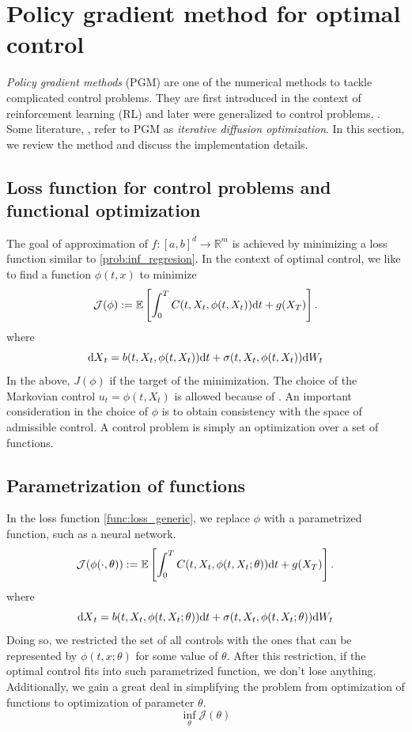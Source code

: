 \documentclass[11pt]{book}
\newcommand{\dt}{\text{\normalfont d}t}
\newcommand{\dX}{\text{\normalfont d}X}
\newcommand{\dW}{\text{\normalfont d}W}
\begin{document}
\section{Policy gradient method for optimal control}
\emph{Policy gradient methods} (PGM) are one of the numerical methods to tackle complicated control problems. They are first introduced in the context of reinforcement learning (RL) and later were generalized to control problems, \citet{Powell19}. Some literature, \citet{NR21}, refer to PGM as \emph{iterative diffusion optimization}. In this section, we review the method and discuss the implementation details. 
\subsection{Loss function for control problems and functional optimization}
The goal of  approximation of $f:[a,b]^d\to\mathbb{R}^m$ is achieved by minimizing a loss function similar to \eqref{prob:inf_regresion}. 
In the context of optimal control, we like to find a function $\phi(t,x)$ to minimize
\begin{equation}\label{func:loss_generic}
{\mathcal{J}}(\phi):=\mathbb{E}\left[\int_0^T C(t,X_t,\phi(t,X_t)){{\dt}}+g(X_T)\right].
\end{equation}
where 
\[
{\dX}_t =b(t,X_t,\phi(t,X_t)){{\dt}}+\sigma(t,X_t,\phi(t,X_t))\dW_t
\]
In the above, $J(\phi)$ if the target of the minimization. The choice of the Markovian control $u_t=\phi(t,X_t)$ is allowed because of \citet{el1987compactification,haussmann1986existence}. An important consideration in the choice of $\phi$ is to obtain consistency with the space of admissible control. 
A control problem is simply an optimization over a set of functions.
\subsection{Parametrization of functions}
In the loss function \eqref{func:loss_generic}, we replace $\phi$ with a parametrized function, such as  a neural network.
\begin{equation}\label{func:loss_parametrized}
{\mathcal{J}}(\phi(\cdot,\theta)):=\mathbb{E}\left[\int_0^T C(t,X_t,\phi(t,X_t;\theta)){{\dt}}+g(X_T)\right].
\end{equation}
where 
\[
{\dX}_t =b(t,X_t,\phi(t,X_t;\theta)){{\dt}}+\sigma(t,X_t,\phi(t,X_t;\theta))\dW_t
\]
Doing so, we restricted the set of all controls with the ones that can be represented by $\phi(t,x;\theta)$ for some value of $\theta$. After this restriction, if the optimal control fits into such parametrized function, we don't lose anything. Additionally, we gain a great deal in simplifying the problem from optimization of functions to optimization of parameter $\theta$.
\[
\inf_{\theta}\mathcal{J}(\theta)
\]
\end{document}
